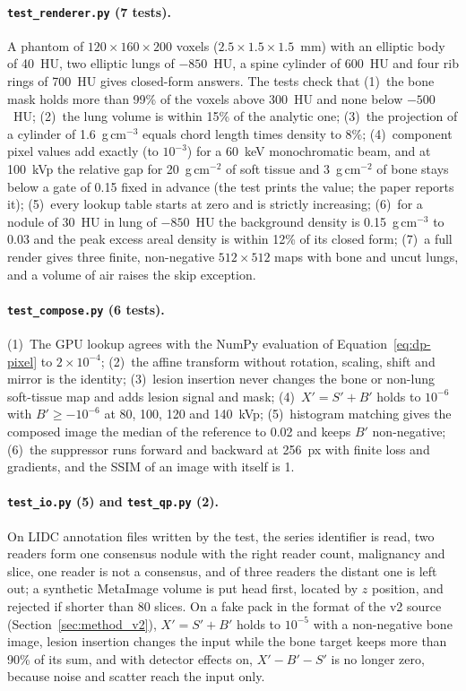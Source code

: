 \paragraph{\texttt{test\_renderer.py} (7 tests).} A phantom of $120\times160\times200$ voxels ($2.5\times1.5\times1.5$~mm) with an elliptic body of
40~HU, two elliptic lungs of $-850$~HU, a spine cylinder of 600~HU and four rib rings of 700~HU gives closed-form answers. The tests check that
(1)~the bone mask holds more than 99\% of the voxels above 300~HU and none below $-500$~HU; (2)~the lung volume is within 15\% of the analytic
one; (3)~the projection of a cylinder of 1.6~g\,cm$^{-3}$ equals chord length times density to 8\%; (4)~component pixel values add exactly (to
$10^{-3}$) for a 60~keV monochromatic beam, and at 100~kVp the relative gap for 20~g\,cm$^{-2}$ of soft tissue and 3~g\,cm$^{-2}$ of bone stays
below a gate of 0.15 fixed in advance (the test prints the value; the paper reports it); (5)~every lookup table starts at zero and is strictly
increasing; (6)~for a nodule of 30~HU in lung of $-850$~HU the background density is 0.15~g\,cm$^{-3}$ to 0.03 and the peak excess areal density
is within 12\% of its closed form; (7)~a full render gives three finite, non-negative $512\times512$ maps with bone and uncut lungs, and a volume of
air raises the skip exception.

\paragraph{\texttt{test\_compose.py} (6 tests).} (1)~The GPU lookup agrees with the NumPy evaluation of Equation~\eqref{eq:dp-pixel} to
$2\times10^{-4}$; (2)~the affine transform without rotation, scaling, shift and mirror is the identity; (3)~lesion insertion never changes the
bone or non-lung soft-tissue map and adds lesion signal and mask; (4)~$X'=S'+B'$ holds to $10^{-6}$ with $B'\ge-10^{-6}$ at 80, 100, 120 and
140~kVp; (5)~histogram matching gives the composed image the median of the reference to 0.02 and keeps $B'$ non-negative; (6)~the suppressor runs
forward and backward at 256~px with finite loss and gradients, and the SSIM of an image with itself is 1.

\paragraph{\texttt{test\_io.py} (5) and \texttt{test\_qp.py} (2).} On LIDC annotation files written by the test, the series identifier is read,
two readers form one consensus nodule with the right reader count, malignancy and slice, one reader is not a consensus, and of three readers the
distant one is left out; a synthetic MetaImage volume is put head first, located by $z$ position, and rejected if shorter than 80 slices. On a fake
pack in the format of the v2 source (Section~\ref{sec:method_v2}), $X'=S'+B'$ holds to $10^{-5}$ with a non-negative bone image, lesion insertion
changes the input while the bone target keeps more than 90\% of its sum, and with detector effects on, $X'-B'-S'$ is no longer zero, because noise
and scatter reach the input only.

